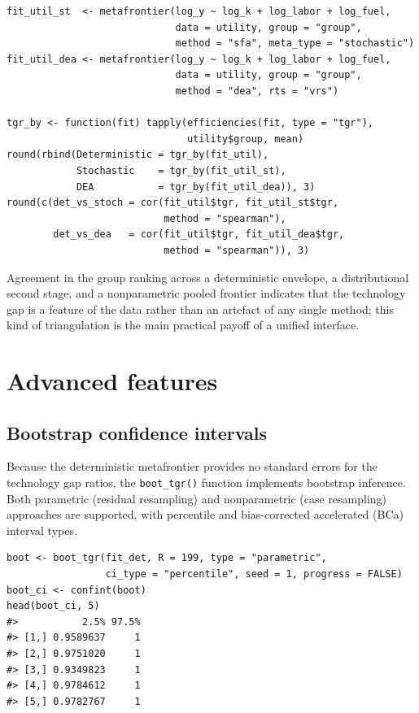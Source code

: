\begin{verbatim}
fit_util_st  <- metafrontier(log_y ~ log_k + log_labor + log_fuel,
                             data = utility, group = "group",
                             method = "sfa", meta_type = "stochastic")
fit_util_dea <- metafrontier(log_y ~ log_k + log_labor + log_fuel,
                             data = utility, group = "group",
                             method = "dea", rts = "vrs")

tgr_by <- function(fit) tapply(efficiencies(fit, type = "tgr"),
                               utility$group, mean)
round(rbind(Deterministic = tgr_by(fit_util),
            Stochastic    = tgr_by(fit_util_st),
            DEA           = tgr_by(fit_util_dea)), 3)
round(c(det_vs_stoch = cor(fit_util$tgr, fit_util_st$tgr,
                           method = "spearman"),
        det_vs_dea   = cor(fit_util$tgr, fit_util_dea$tgr,
                           method = "spearman")), 3)
\end{verbatim}

Agreement in the group ranking across a deterministic envelope, a
distributional second stage, and a nonparametric pooled frontier indicates
that the technology gap is a feature of the data rather than an artefact
of any single method; this kind of triangulation is the main practical
payoff of a unified interface.

\section{Advanced features}\label{sec:advanced-features}

\subsection{Bootstrap confidence intervals}\label{sec:bootstrap-ci}

Because the deterministic metafrontier provides no standard errors for the
technology gap ratios, the \texttt{boot\_tgr()} function implements bootstrap inference.
Both parametric (residual resampling) and nonparametric (case resampling)
approaches are supported, with percentile and bias-corrected accelerated (BCa)
interval types.

\begin{verbatim}
boot <- boot_tgr(fit_det, R = 199, type = "parametric",
                 ci_type = "percentile", seed = 1, progress = FALSE)
boot_ci <- confint(boot)
head(boot_ci, 5)
#>           2.5% 97.5%
#> [1,] 0.9589637     1
#> [2,] 0.9751020     1
#> [3,] 0.9349823     1
#> [4,] 0.9784612     1
#> [5,] 0.9782767     1
\end{verbatim}

